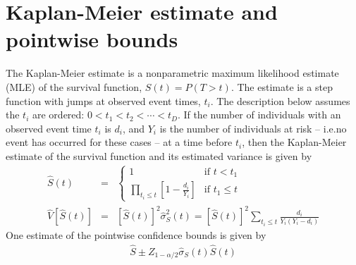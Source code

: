 \documentclass[article]{jss}
\begin{document}
\pagebreak

\section[Kaplan-Meier estimate and pointwise bounds]{Kaplan-Meier estimate and pointwise bounds}
\label{kapMeiEstimateAndBounds}

The Kaplan-Meier estimate is a nonparametric maximum likelihood estimate (MLE) of the survival function, $S(t) = P(T > t)$. The estimate is a step function with jumps at observed event times, $t_i$. The description below assumes the $t_i$ are ordered: $0 < t_1 < t_2 <  \cdots < t_D$. If the number of individuals with an observed event time $t_i$ is $d_i$, and $Y_i$ is the number of individuals at risk -- i.e.\hspace{1mm}no event has occurred for these cases -- at a time before $t_i$, then the Kaplan-Meier estimate of the survival function and its estimated variance is given by
\begin{eqnarray*}
\hat{S}(t) &=& \left\{\begin{array}{cl}1 & \text{if }t < t_1 \\ \prod_{t_i \leq t}\left[ 1- \frac{d_i}{Y_i} \right] &\text{if }t_1 \leq t \end{array}\right.  \\
\widehat{V}[\hat{S}(t)] &=& \left[ \hat{S}(t) \right]^2 \hat{\sigma}_S^2(t) = \left[ \hat{S}(t) \right]^2 \sum_{t_i \leq t} \frac{d_i}{Y_i(Y_i-d_i)}
\end{eqnarray*}
One estimate of the pointwise confidence bounds %
is given by
\begin{eqnarray} \label{plainPWCI}
\hat{S} \pm Z_{1-\alpha/2}\hat{\sigma}_S(t)\hat{S}(t)
\end{eqnarray}
\end{document}
